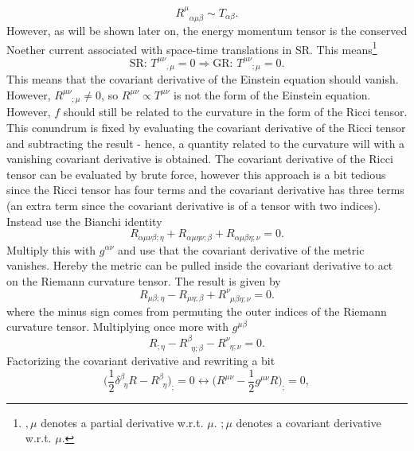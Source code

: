 \begin{equation}
	R^{\mu}_{\,\,\,\, \alpha \mu\beta}\sim T_{\alpha\beta}.
\end{equation} 
However, as will be shown later on, the energy momentum tensor is the conserved Noether current associated with space-time translations in SR. This means\footnote{$,\mu$ denotes a partial derivative w.r.t. $\mu$. $;\mu$ denotes a covariant derivative w.r.t. $\mu$.}
\begin{equation}
	\text{SR:   }T^{\mu\nu}_{\,\,\,\,\,\,\, ,\mu}=0\Rightarrow \text{GR:   }T^{\mu\nu}_{\,\,\,\,\,\,\, ;\mu}=0.
\end{equation} 
This means that the covariant derivative of the Einstein equation should vanish. However, $R^{\mu\nu}_{\,\,\,\,\,\,\, ;\mu}\neq 0$, so $R^{\mu\nu}\propto T^{\mu\nu}$ is not the form of the Einstein equation. However, $f$ should still be related to the curvature in the form of the Ricci tensor. This conundrum is fixed by evaluating the covariant derivative of the Ricci tensor and subtracting the result - hence, a quantity related to the curvature will with a vanishing covariant derivative is obtained. The covariant derivative of the Ricci tensor can be evaluated by brute force, however this approach is a bit tedious since the Ricci tensor has four terms and the covariant derivative has three terms (an extra term since the covariant derivative is of a tensor with two indices). Instead use the Bianchi identity
\begin{equation}
	R_{\alpha\mu\nu\beta;\eta}+R_{\alpha\mu\eta\nu;\beta}+R_{\alpha\mu\beta\eta;\nu}=0.
\end{equation}  
Multiply this with $g^{\alpha\nu}$ and use that the covariant derivative of the metric vanishes. Hereby the metric can be pulled inside the covariant derivative to act on the Riemann curvature tensor. The result is given by
\begin{equation}
	R_{\mu\beta;\eta}-R_{\mu\eta;\beta}+R^\nu_{\,\,\,\mu\beta\eta;\nu}=0.
\end{equation}  
where the minus sign comes from permuting the outer indices of the Riemann curvature tensor. Multiplying once more with $g^{\mu\beta}$
\begin{equation}
	R_{;\eta}-R^ \beta_{\,\,\,\eta;\beta}-R^\nu_{\,\,\,\eta;\nu}=0.
\end{equation}  
Factorizing the covariant derivative and rewriting a bit
\begin{equation}
	\bigg(\frac{1}{2}\delta^\beta_{\,\,\,\eta}R-R^{\beta}_{\,\,\,\eta}\bigg)_;=0 \leftrightarrow \bigg(R^{\mu\nu}-\frac{1}{2}g^{\mu\nu}R\bigg)_;=0,
\end{equation}  

